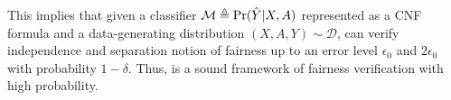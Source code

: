 This implies that given a classifier $ \mathcal{M} \triangleq \Pr(\hat{Y}|X, A) $ represented as a CNF formula and a data-generating distribution $ (X,A,Y) \sim \mathcal{D} $, {\justicia} can verify independence and separation notion of fairness up to an error level $\epsilon_0$ and $2\epsilon_0$ with probability $1-\delta$.
Thus, {\justicia} is a sound framework of fairness verification with high probability.



\iffalse

\begin{corollary}[Hypothesis]
	If $k$ samples are considered in \justicia and the estimated group fairness value $\hat{GF}$ satisfies
	\begin{equation*}
	1- e^{\epsilon_0} \leq \frac{\hat{GF}}{GF} \leq 1 + e^{\epsilon_0}
	\end{equation*}
	with probability $1-\delta$, then
	\begin{equation*}
	k = O\left((n+ \ln(1/\delta))\frac{m + \ln m}{\ln \epsilon_0}\right).
	\end{equation*}
\end{corollary}
\fi


